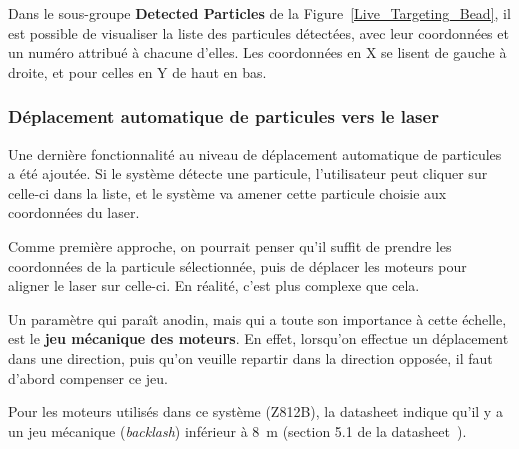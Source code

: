 Dans le sous-groupe \textbf{Detected Particles} de la Figure~\ref{Live_Targeting_Bead}, il est possible de visualiser la liste des particules détectées, avec leur coordonnées et un numéro attribué à chacune d'elles. Les coordonnées en X se lisent de gauche à droite, et pour celles en Y de haut en bas.

\newpage
\subsubsection{Déplacement automatique de particules vers le laser}
Une dernière fonctionnalité au niveau de déplacement automatique de particules a été ajoutée. Si le système détecte une particule, l'utilisateur peut cliquer sur celle-ci dans la liste, et le système va amener cette particule choisie aux coordonnées du laser.

Comme première approche, on pourrait penser qu'il suffit de prendre les coordonnées de la particule sélectionnée, puis de déplacer les moteurs pour aligner le laser sur celle-ci. En réalité, c'est plus complexe que cela.

Un paramètre qui paraît anodin, mais qui a toute son importance à cette échelle, est le \textbf{jeu mécanique des moteurs}. En effet, lorsqu'on effectue un déplacement dans une direction, puis qu'on veuille repartir dans la direction opposée, il faut d'abord compenser ce jeu.

Pour les moteurs utilisés dans ce système (Z812B), la datasheet indique qu'il y a un jeu mécanique (\textit{backlash}) inférieur à 8~\textmu m (section 5.1 de la datasheet~\cite{motorZ812B}).


